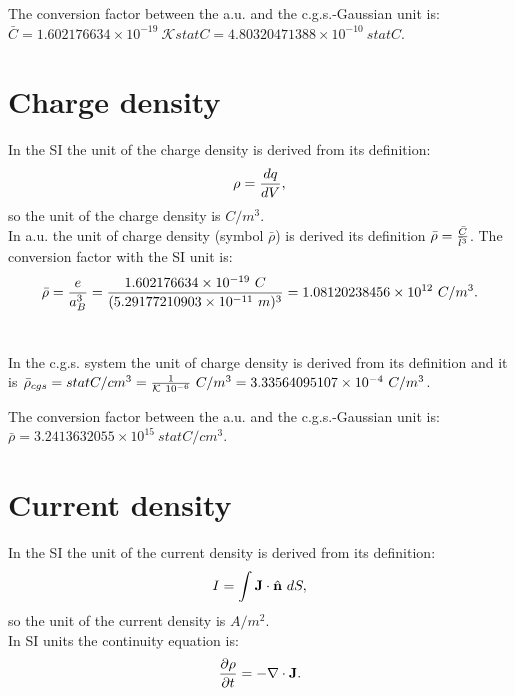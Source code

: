 \documentclass[12pt,a4paper]{article}
\def\barl{5.29177210903\times 10^{-11}}
\def\barc{1.602176634\times 10^{-19}}
\def\barrho{1.08120238456\times 10^{12}}
\def\rhotorho{3.33564095107\times 10^{-4}}
\def\barccgs{4.80320471388\times 10^{-10}}
\def\barrhocgs{3.2413632055\times 10^{15}}
\begin{document}

{\color{green} The conversion factor between the a.u. and the 
c.g.s.-Gaussian unit is: $\bar C=\barc\ \mathcal{K} statC=\barccgs\ statC$. \\
}

\newpage
\section{\color{coral}Charge density}
In the SI the unit of the charge density is derived from its
definition:
\begin{equation}
\rho={dq \over dV},
\end{equation}
so the unit of the charge density is $C/m^3$.
\\

{\color{web-blue} In a.u. the unit of charge density (symbol $\bar \rho$) 
is derived its definition $\bar \rho ={\bar C \over \bar l^3}$. The
conversion factor with the SI unit is: 
\begin{equation}
\bar \rho = {e\over a_B^3} =
{\barc\ C\over (\barl\ m)^3}=\barrho\ C/m^3. 
\end{equation}
\\
}

{\color{orange} In the c.g.s. system the unit of charge density  
is derived from its definition and it is
$\bar \rho_{cgs}=statC/cm^3 = {1 \over \mathcal{K}\ 10^{-6}}\ C/m^3=\rhotorho\ C/m^3$.
\\
}

{\color{green} The conversion factor between the a.u. and the 
c.g.s.-Gaussian unit is: $\bar \rho = \barrhocgs\ statC/cm^3$. 
\\
}

\newpage
\section{\color{coral}Current density}
In the SI the unit of the current density is derived from 
its definition:
\begin{equation}
I=\int {\bf J}\cdot \hat {\bf n}\ dS,
\end{equation}
so the unit of the current density is $A/m^2$.
\\
In SI units the continuity equation is:
\begin{equation}
{\partial \rho \over \partial t}=-\nabla \cdot {\bf J}.
\label{continuitysi}
\end{equation}
\\
\end{document}
